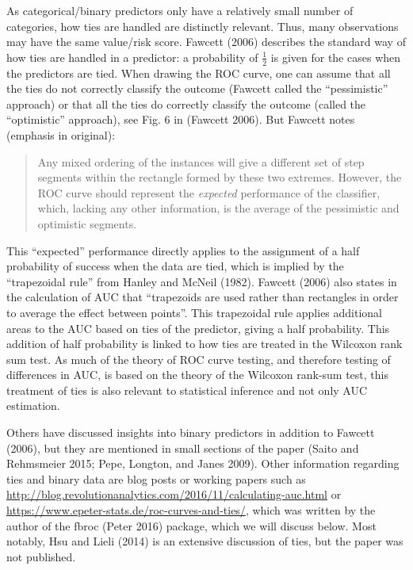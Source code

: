 \documentclass[smallextended]{svjour3}       %
\begin{document}
As categorical/binary predictors only have a relatively small number of
categories, how ties are handled are distinctly relevant. Thus, many
observations may have the same value/risk score. Fawcett (2006)
describes the standard way of how ties are handled in a predictor: a
probability of \(\frac{1}{2}\) is given for the cases when the
predictors are tied. When drawing the ROC curve, one can assume that all
the ties do not correctly classify the outcome (Fawcett called the
``pessimistic'' approach) or that all the ties do correctly classify the
outcome (called the ``optimistic'' approach), see Fig. 6 in (Fawcett
2006). But Fawcett notes (emphasis in original):

\begin{quote}
Any mixed ordering of the instances will give a different set of step
segments within the rectangle formed by these two extremes. However, the
ROC curve should represent the \emph{expected} performance of the
classifier, which, lacking any other information, is the average of the
pessimistic and optimistic segments.
\end{quote}

This ``expected'' performance directly applies to the assignment of a
half probability of success when the data are tied, which is implied by
the ``trapezoidal rule'' from Hanley and McNeil (1982). Fawcett (2006)
also states in the calculation of AUC that ``trapezoids are used rather
than rectangles in order to average the effect between points''. This
trapezoidal rule applies additional areas to the AUC based on ties of
the predictor, giving a half probability. This addition of half
probability is linked to how ties are treated in the Wilcoxon rank sum
test. As much of the theory of ROC curve testing, and therefore testing
of differences in AUC, is based on the theory of the Wilcoxon rank-sum
test, this treatment of ties is also relevant to statistical inference
and not only AUC estimation.

Others have discussed insights into binary predictors in addition to
Fawcett (2006), but they are mentioned in small sections of the paper
(Saito and Rehmsmeier 2015; Pepe, Longton, and Janes 2009). Other
information regarding ties and binary data are blog posts or working
papers such as
\url{http://blog.revolutionanalytics.com/2016/11/calculating-auc.html}
or \url{https://www.epeter-stats.de/roc-curves-and-ties/}, which was
written by the author of the {\selectfont fbroc} (Peter
2016) package, which we will discuss below. Most notably, Hsu and Lieli
(2014) is an extensive discussion of ties, but the paper was not
published.
\end{document}
